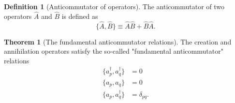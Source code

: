 \documentclass[a4paper,10pt]{article}
\theoremstyle{definition}
\newtheorem{definition}{Definition}
\newtheorem{theorem}{Theorem}
\begin{document}
\begin{definition}[Anticommutator of operators]
The anticommutator of two operators $\hat{A}$ and $\hat{B}$ is defined as
 \begin{equation}
 \{\hat{A},\hat{B}\} \equiv \hat{A}\hat{B}+\hat{B}\hat{A}.                      
\end{equation}
\end{definition}
\begin{theorem}[The fundamental anticommutator relations]
The creation and annihilation operators satisfy the so-called "fundamental anticommutator" relations
\begin{align}
 \{a_p^\dagger,a_q^\dagger \} &= 0\\
 \{a_p,a_q \} &= 0\\
 \{a_p,a_q^\dagger \} &= \delta_{pq}.\\
\end{align}
\end{theorem}
\end{document}
